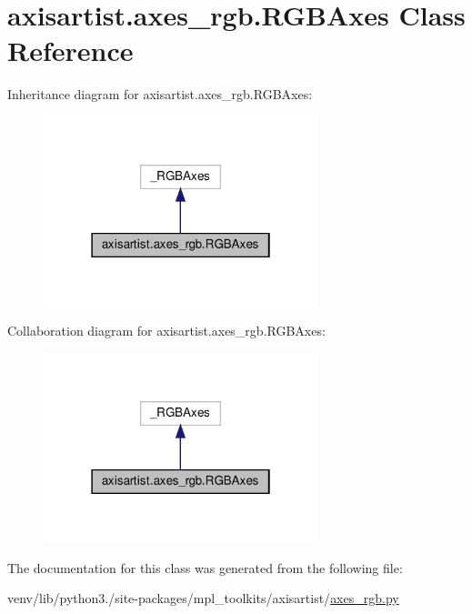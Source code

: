 \hypertarget{classaxisartist_1_1axes__rgb_1_1RGBAxes}{}\section{axisartist.\+axes\+\_\+rgb.\+R\+G\+B\+Axes Class Reference}
\label{classaxisartist_1_1axes__rgb_1_1RGBAxes}


Inheritance diagram for axisartist.\+axes\+\_\+rgb.\+R\+G\+B\+Axes\+:
\nopagebreak
\begin{figure}[H]
\begin{center}
\leavevmode
\includegraphics[width=226pt]{classaxisartist_1_1axes__rgb_1_1RGBAxes__inherit__graph}
\end{center}
\end{figure}


Collaboration diagram for axisartist.\+axes\+\_\+rgb.\+R\+G\+B\+Axes\+:
\nopagebreak
\begin{figure}[H]
\begin{center}
\leavevmode
\includegraphics[width=226pt]{classaxisartist_1_1axes__rgb_1_1RGBAxes__coll__graph}
\end{center}
\end{figure}


The documentation for this class was generated from the following file\+:\begin{DoxyCompactItemize}
\item 
venv/lib/python3./site-\/packages/mpl\+\_\+toolkits/axisartist/\hyperlink{axisartist_2axes__rgb_8py}{axes\+\_\+rgb.\+py}\end{DoxyCompactItemize}
